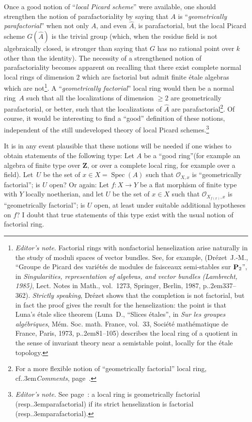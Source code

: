 \documentclass[11pt,a4paper,oneside]{book}
\providecommand{\sisi}[2]{#2}
\providecommand{\pageoriginale}{%
  \refstepcounter{pageoriginal}%
  \marginpar{\raggedright\footnotesize\bfseries\thepageoriginal}%
  \xspace}
\providecommand{\nde}[1]{\footnote{\textit{Editor's note.} #1}}
\providecommand{\sfootnote}[1]{\footnote{#1}}
\providecommand{\og}{``}
\providecommand{\fg}{''\xspace}
\providecommand{\cf}{cf.\kern.3em}
\providecommand{\resp}{resp.\kern.3em}
\providecommand{\ptbl}{.\kern.2em}
\providecommand{\Oo}{\mathcal O}
\providecommand{\ZZ}{\mathbf Z}
\providecommand{\OXx}{\mathcal O_{X,x}}
\providecommand{\Spec}{\operatorname{Spec}}
\theoremstyle{plain}
\theoremstyle{definition}
\theoremstyle{remark}
\begin{document}
\label{pXIII20}%
Once a good notion of \og \emph{local Picard scheme}\fg were available, one should strengthen the notion of parafactoriality by saying that $A$ is \og \emph{geometrically parafactorial}\fg when not only $A$, and even $\widehat{A}$, is parafactorial, but the local Picard scheme $G(\widehat{A})$ is the trivial group (which, when the residue field is not algebraically closed, is stronger than saying that $G$ has no rational point over $k$ other than the identity). The necessity of a strengthened notion of parafactoriality becomes apparent on recalling that there exist complete normal local rings of dimension $2$ which are factorial but admit finite \'etale algebras which are not\nde{Factorial rings with nonfactorial henselization arise naturally in the study of moduli spaces of vector bundles. See, for example, (Dr\'ezet~J.-M., {\og Groupe de Picard des vari\'et\'es de modules de faisceaux semi-stables sur $\mathbf{P}\sb 2$\fg}, in \emph{Singularities, representation of algebras, and vector bundles (Lambrecht, 1985)},
Lect. Notes in Math., vol.~1273, Springer, Berlin, 1987, p\ptbl 337--362). \textit{Strictly speaking}, Dr\'ezet shows that the completion is not factorial, but in fact the proof gives the result for the henselization: the point is that Luna's \'etale slice theorem (Luna~D., {\og Slices \'etales\fg}, in \emph{Sur les groupes alg\'ebriques}, M\'em. Soc. math. France, vol.~33, Soci\'et\'e math\'ematique de France, Paris, 1973, p\ptbl 81--105) describes the local ring of a quotient in the sense of invariant theory near a semistable point, locally for the \'etale topology.}. A \og \emph{geometrically factorial}\fg local ring would then be a normal ring~$A$ such that all \sisi{t}{th}e localizations of dimension $\geq 2$ are geometrically parafactorial, or better, such that the localizations of $\widehat{A}$ are parafactorial\sfootnote{For a more flexible notion of \og geometrically factorial\fg local ring, \cf \emph{Comments}, page~\pageref{commpara}.}. Of course, it would be interesting to find a \og good\fg definition of these notions, independent of the still undeveloped theory of local Picard schemes.\nde{See page~\pageref{commpara}: a local ring is geometrically factorial (\resp parafactorial) if its strict henselization is factorial (\resp parafactorial).}

It is in any event plausible that these notions will be needed if one wishes to obtain statements of the following type: Let $A$ be a \og good ring\fg (for example an algebra of finite type over $\ZZ$, or over a complete local ring, for example over a field). Let~$U$ be the set of $x\in X=\Spec(A)$ such that $\OXx$ is \og geometrically\pageoriginale factorial\fg; is $U$ open\sisi{?.}{?} Or again: Let $f\colon X\to Y$ be a flat morphism of finite type with $Y$ locally noetherian, and let $U$ be the set of $x\in X$ such that $\Oo_{X_{f(x)}, x}$ is \og geometrically factorial\fg; is $U$ open, at least under suitable additional hypotheses on $f$\sisi{?.}{?} I doubt that true statements of this type exist with the usual notion of factorial ring.
\end{document}
